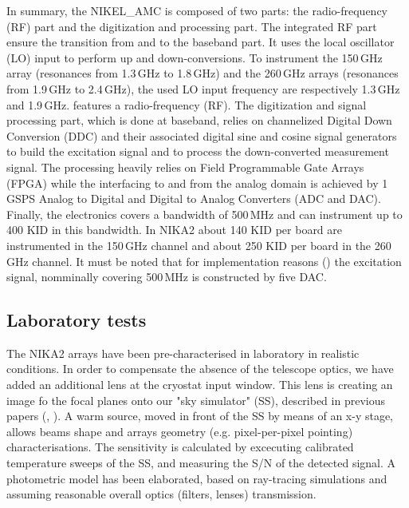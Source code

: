 \documentclass[]{aa} %
\begin{document}
In summary, the NIKEL\_AMC is composed of two parts: the radio-frequency (RF) part and the digitization and processing part.
The integrated RF part ensure the transition from and to the baseband part.
It uses the local oscillator (LO) input to perform up and down-conversions.
To instrument the 150\,GHz array (resonances from 1.3\,GHz to 1.8\,GHz) and the 260\,GHz arrays (resonances from 1.9\,GHz to 2.4\,GHz), the used LO input frequency are respectively 1.3\,GHz and 1.9\,GHz.
features a radio-frequency (RF).
The digitization and signal processing part, which is done at baseband, relies on channelized Digital Down Conversion (DDC) and their associated digital sine and cosine signal generators to build the excitation signal and to process the down-converted measurement signal.
The processing heavily relies on Field Programmable Gate Arrays (FPGA) while the interfacing to and from the analog domain is achieved by 1\,GSPS Analog to Digital and Digital to Analog Converters (ADC and DAC).
Finally, the electronics covers a bandwidth of 500\,MHz and can instrument up to 400 KID in this bandwidth. In NIKA2 about 140 KID per board are instrumented in the 150\,GHz channel and about 250 KID per board in the 260\,GHz channel.
It must be noted that for implementation reasons (\cite{Bourrion2012,Bourrion2016}) the excitation signal, nomminally covering 500\,MHz is constructed by five DAC.



\subsection{Laboratory tests}
\label{Laboratory tests}

The NIKA2 arrays have been pre-characterised in laboratory in realistic conditions. In order to compensate the absence of the telescope optics, we have added an additional lens at the cryostat input window. This lens is creating an image fo the focal planes onto our "sky simulator" (SS), described in previous papers (\cite{Catalano2014}, \cite{Monfardini2011}). A warm source, moved in front of the SS by means of an x-y stage, allows beams shape and arrays geometry (e.g. pixel-per-pixel pointing) characterisations. The sensitivity is calculated by excecuting calibrated temperature sweeps of the SS, and measuring the S/N of the detected signal. A photometric model has been elaborated, based on ray-tracing simulations and assuming reasonable overall optics (filters, lenses) transmission. 
\end{document}
